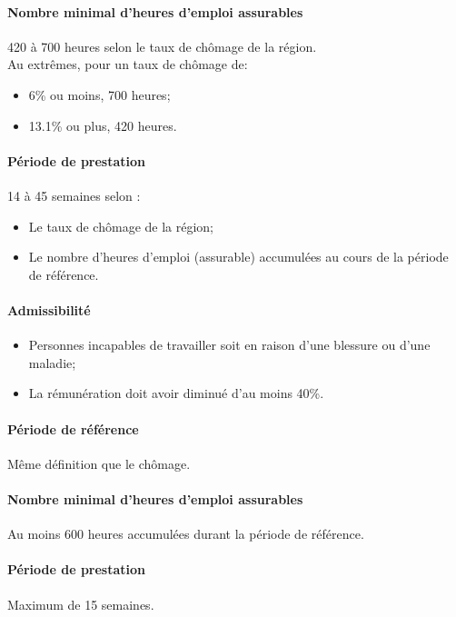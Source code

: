 \documentclass[10pt, french]{article}
\begin{document}
\begin{multicols*}{3}
\begin{definitionNOHFILL}
\paragraph{Nombre minimal d'heures d'emploi assurables}
420 à 700 heures selon le taux de chômage de la région. \\
Au extrêmes, pour un taux de chômage de:
\begin{itemize}[leftmargin = *]
	\item	6\% ou moins, 700 heures;
	\item	13.1\% ou plus, 420 heures.
\end{itemize}

\paragraph{Période de prestation}
14 à 45 semaines selon :
\begin{itemize}[leftmargin = *]
	\item	Le taux de chômage de la région;
	\item	Le nombre d'heures d'emploi (assurable) accumulées au cours de la période de référence.
\end{itemize}
\end{definitionNOHFILL}

\begin{definitionNOHFILL}
\paragraph{Admissibilité}
\begin{itemize}[leftmargin = *]
	\item	Personnes incapables de travailler soit en raison d'une blessure ou d'une maladie;
	\item	La rémunération doit avoir diminué d'au moins 40\%.
\end{itemize}

\paragraph{Période de référence}
Même définition que le chômage.

\paragraph{Nombre minimal d'heures d'emploi assurables}
Au moins 600 heures accumulées durant la période de référence.

\paragraph{Période de prestation}
Maximum de 15 semaines.
\end{definitionNOHFILL}


\end{multicols*}
\end{document}
